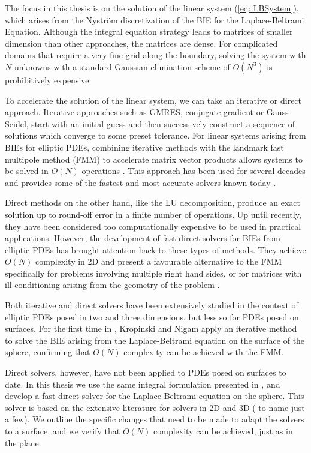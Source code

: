 \documentclass{sfuthesis}
\begin{document}
The focus in this thesis is on the solution of the linear system (\ref{eq: LBSystem}), which arises from the Nystr\"{o}m discretization of the BIE for the Laplace-Beltrami Equation. Although the integral equation strategy leads to matrices of smaller dimension than other approaches, the matrices are dense. For complicated domains that require a very fine grid along the boundary, solving the system with $N$ unknowns with a standard Gaussian elimination scheme of $O(N^3)$ is prohibitively expensive. 

To accelerate the solution of the linear system, we can take an iterative or direct approach. Iterative approaches such as GMRES, conjugate gradient or Gauss-Seidel, start with an initial guess and then successively construct a sequence of solutions which converge to some preset tolerance. For linear systems arising from BIEs for elliptic PDEs, combining iterative methods with the landmark fast multipole method (FMM) to accelerate matrix vector products allows systems to be solved in $O(N)$ operations \cite{GreenRok87, Green88}. This approach has been used for several decades and provides some of the fastest and most accurate solvers known today \cite{HoGreen2012}. 

Direct methods on the other hand, like the LU decomposition, produce an exact solution up to round-off error in a finite number of operations. Up until recently, they have been considered too computationally expensive to be used in practical applications. However, the development of fast direct solvers for BIEs from elliptic PDEs has brought attention back to these types of methods. They achieve $O(N)$ complexity in 2D and present a favourable alternative to the FMM specifically for problems involving multiple right hand sides, or for matrices with ill-conditioning arising from the geometry of the problem \cite{MartRokh2005, GillYoungMart2012, HoGreen2012}. 

Both iterative and direct solvers have been extensively studied in the context of elliptic PDEs posed in two and three dimensions, but less so for PDEs posed on surfaces. For the first time in \cite{KropNig2014}, Kropinski and Nigam apply an iterative method to solve the BIE arising from the Laplace-Beltrami equation on the surface of the sphere, confirming that $O(N)$ complexity can be achieved with the FMM. 

Direct solvers, however, have not been applied to PDEs posed on surfaces to date. In this thesis we use the same integral formulation presented in \cite{KropNig2014}, and develop a fast direct solver for the Laplace-Beltrami equation on the sphere. This solver is based on the extensive literature for solvers in 2D and 3D (\cite{MartRokh2005, GillYoungMart2012, HoGreen2012} to name just a few). We outline the specific changes that need to be made to adapt the solvers to a surface, and we verify that $O(N)$ complexity can be achieved, just as in the plane. 
\end{document}
